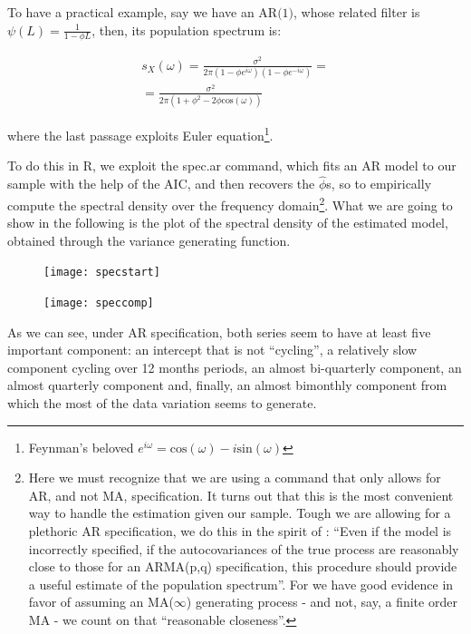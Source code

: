 \documentclass[12pt]{article} %
\begin{document}
To have a practical example, say we have an $\text{AR(1)}$, whose related filter is $\psi(L)=\frac{1}{1-\phi L}$, then, its population spectrum is:

\begin{equation}
\begin{aligned}
s_X(\omega)=\frac{\sigma^2}{2\pi(1-\phi e^{i\omega})(1-\phi e^{-i\omega})}=\\
=\frac{\sigma^2}{2\pi(1+\phi^2-2\phi\text{cos}(\omega))}
\end{aligned}
\end{equation}

where the last passage exploits Euler equation\footnote{
Feynman's beloved $e^{i\omega}=\text{cos}(\omega)-i\text{sin}(\omega)$}.

To do this in R, we exploit the spec.ar command, which fits an AR model to our sample with the help of the AIC, and then recovers the $\hat{\phi}$s, so to empirically compute the spectral density over the frequency domain\footnote{Here we must recognize that we are using a command that only allows for AR, and not MA, specification. It turns out that this is the most convenient way to handle the estimation given our sample. Tough we are allowing for a plethoric AR specification, we do this in the spirit of \citet[p.165]{hammy}: ``Even if the model is incorrectly specified, if the autocovariances of the true process are reasonably close to those for an ARMA(p,q) specification, this procedure should provide a useful estimate of the population spectrum''. For we have good evidence in favor of assuming an MA($\infty$) generating process - and not, say, a finite order MA -  we count on that ``reasonable closeness''.}. What we are going to show in the following is the plot of the spectral density of the estimated model, obtained through the variance generating function.

\begin{figure}[H]
\begin{center}
\texttt{[image: specstart]}
\caption{}
\end{center}
\end{figure}

\begin{figure}[H]
\begin{center}
\texttt{[image: speccomp]}
\caption{}
\end{center}
\end{figure}

As we can see, under AR specification, both series seem to have at least five important component: an intercept that is not ``cycling'', a relatively slow component cycling over 12 months periods, an almost bi-quarterly component, an almost quarterly component and, finally, an almost bimonthly component from which the most of the data variation seems to generate.
\end{document}
